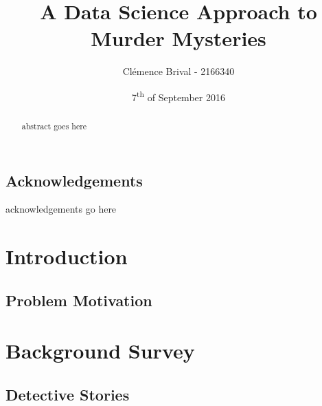 \documentclass{mproj}
\begin{document}
\title{A Data Science Approach to Murder Mysteries}
\author{Cl\'{e}mence Brival - 2166340}
\date{7\textsuperscript{th} of September 2016}
\maketitle


\begin{abstract}
abstract goes here
\end{abstract}

\educationalconsent


\newpage
\section*{Acknowledgements}

acknowledgements go here


\tableofcontents


\chapter{Introduction}\label{intro}

\section{Problem Motivation}


\chapter{Background Survey}\label{survey}

\section{Detective Stories}
\end{document}
